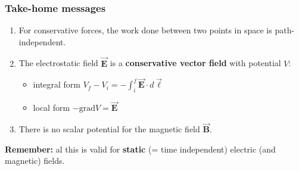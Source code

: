 \documentclass{beamer}
\newcommand{\vc}[1]{\vec{\boldsymbol{#1}}}
\begin{document}
\begin{frame}
\frametitle{Take-home messages}
\begin{enumerate}
	\item For conservative forces, the work done between two points in space is path-independent.
	\item The electrostatic field $\vc{E}$ is a \textbf{conservative vector field} with potential $V$:
	\begin{itemize}
	\item integral form $V_f-V_i=-\int_i^f \vc{E} \cdot d\vc{\ell}$
	\item local form $-\text{grad} V = \vc{E}$
	\end{itemize}
	\item There is no scalar potential for the magnetic field $\vc{B}$.
\end{enumerate}

\textbf{Remember:} al this is valid for \textbf{static} (= time independent) electric (and magnetic) fields.
\end{frame}
\end{document}
